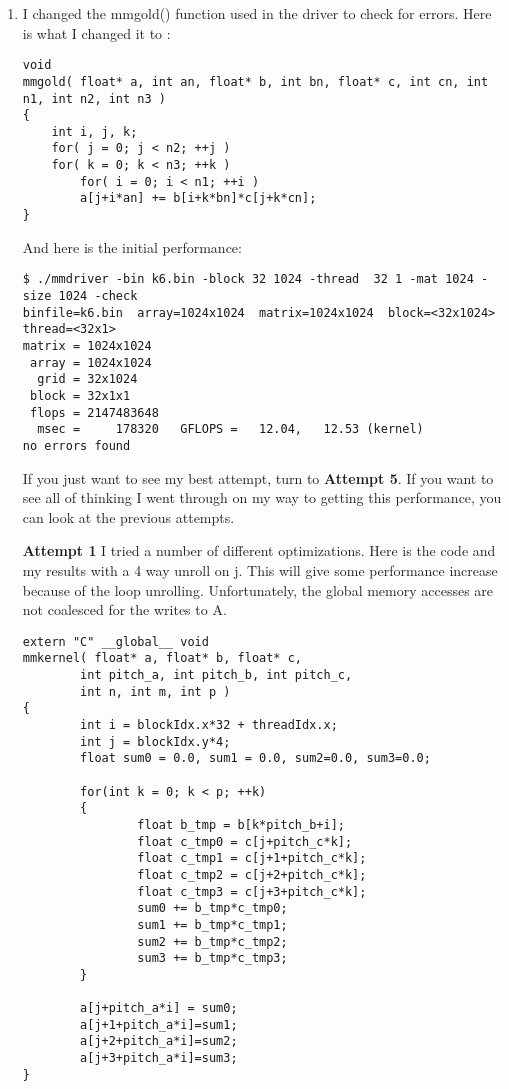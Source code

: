 \documentclass[11pt]{article}
\begin{document}
\begin{enumerate}
\item I changed the mmgold() function used in the driver to check for errors. 
Here is what I changed it to :
\begin{lstlisting}
void
mmgold( float* a, int an, float* b, int bn, float* c, int cn, int n1, int n2, int n3 )
{
    int i, j, k;
    for( j = 0; j < n2; ++j )
	for( k = 0; k < n3; ++k )
	    for( i = 0; i < n1; ++i )
		a[j+i*an] += b[i+k*bn]*c[j+k*cn];
}
\end{lstlisting}

And here is the initial performance:

\begin{lstlisting}
$ ./mmdriver -bin k6.bin -block 32 1024 -thread  32 1 -mat 1024 -size 1024 -check
binfile=k6.bin  array=1024x1024  matrix=1024x1024  block=<32x1024>  thread=<32x1>
matrix = 1024x1024
 array = 1024x1024
  grid = 32x1024
 block = 32x1x1
 flops = 2147483648
  msec =     178320   GFLOPS =   12.04,   12.53 (kernel)
no errors found
\end{lstlisting}

If you just want to see my best attempt, turn to \textbf{Attempt 5}. If you want to see all of thinking I went through on my way to getting this performance, you can look at the previous attempts.

\textbf{Attempt 1}
I tried a number of different optimizations. Here is the code and my results with a 4 way unroll on j. This will give some performance increase because of the loop unrolling. Unfortunately, the global memory accesses are not coalesced for the writes to A.

\begin{lstlisting}
extern "C" __global__ void
mmkernel( float* a, float* b, float* c,
        int pitch_a, int pitch_b, int pitch_c,
        int n, int m, int p )
{
        int i = blockIdx.x*32 + threadIdx.x;
        int j = blockIdx.y*4;
        float sum0 = 0.0, sum1 = 0.0, sum2=0.0, sum3=0.0;

        for(int k = 0; k < p; ++k)
        {
                float b_tmp = b[k*pitch_b+i];
                float c_tmp0 = c[j+pitch_c*k];
                float c_tmp1 = c[j+1+pitch_c*k];
                float c_tmp2 = c[j+2+pitch_c*k];
                float c_tmp3 = c[j+3+pitch_c*k];
                sum0 += b_tmp*c_tmp0;
                sum1 += b_tmp*c_tmp1;
                sum2 += b_tmp*c_tmp2;
                sum3 += b_tmp*c_tmp3;
        }

        a[j+pitch_a*i] = sum0;   
        a[j+1+pitch_a*i]=sum1;
		a[j+2+pitch_a*i]=sum2;
		a[j+3+pitch_a*i]=sum3;
}
\end{lstlisting}


\end{enumerate}
\end{document}
